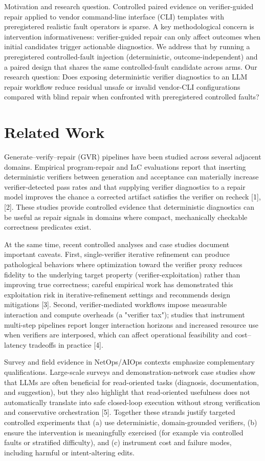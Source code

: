 \documentclass[conference]{IEEEtran}
\begin{document}
Motivation and research question. Controlled paired evidence on verifier-guided repair applied to vendor command-line interface (CLI) templates with preregistered realistic fault operators is sparse. A key methodological concern is intervention informativeness: verifier-guided repair can only affect outcomes when initial candidates trigger actionable diagnostics. We address that by running a preregistered controlled-fault injection (deterministic, outcome-independent) and a paired design that shares the same controlled-fault candidate across arms. Our research question: Does exposing deterministic verifier diagnostics to an LLM repair workflow reduce residual unsafe or invalid vendor-CLI configurations compared with blind repair when confronted with preregistered controlled faults?

\section{Related Work}
Generate--verify--repair (GVR) pipelines have been studied across several adjacent domains. Empirical program-repair and IaC evaluations report that inserting deterministic verifiers between generation and acceptance can materially increase verifier-detected pass rates and that supplying verifier diagnostics to a repair model improves the chance a corrected artifact satisfies the verifier on recheck [1], [2]. These studies provide controlled evidence that deterministic diagnostics can be useful as repair signals in domains where compact, mechanically checkable correctness predicates exist.

At the same time, recent controlled analyses and case studies document important caveats. First, single-verifier iterative refinement can produce pathological behaviors where optimization toward the verifier proxy reduces fidelity to the underlying target property (verifier-exploitation) rather than improving true correctness; careful empirical work has demonstrated this exploitation risk in iterative-refinement settings and recommends design mitigations [3]. Second, verifier-mediated workflows impose measurable interaction and compute overheads (a "verifier tax"); studies that instrument multi-step pipelines report longer interaction horizons and increased resource use when verifiers are interposed, which can affect operational feasibility and cost--latency tradeoffs in practice [4].

Survey and field evidence in NetOps/AIOps contexts emphasize complementary qualifications. Large-scale surveys and demonstration-network case studies show that LLMs are often beneficial for read-oriented tasks (diagnosis, documentation, and suggestion), but they also highlight that read-oriented usefulness does not automatically translate into safe closed-loop execution without strong verification and conservative orchestration [5]. Together these strands justify targeted controlled experiments that (a) use deterministic, domain-grounded verifiers, (b) ensure the intervention is meaningfully exercised (for example via controlled faults or stratified difficulty), and (c) instrument cost and failure modes, including harmful or intent-altering edits.
\end{document}
